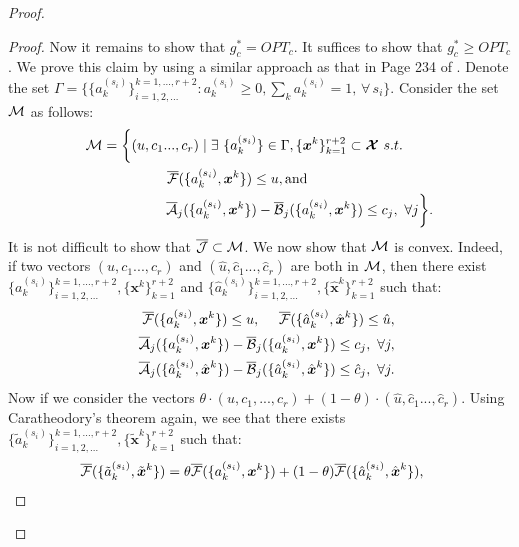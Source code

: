 \documentclass[journal]{IEEEtran}
\newcommand{\bv}[1]{{\boldsymbol{#1} }}
\newcommand{\script}[1]{{{\cal{#1} }}}
\begin{document}
\begin{proof}
\begin{proof}
Now it remains to show that $g_c^*=OPT_c$. It suffices to show that $g_c^*\geq OPT_c$. We prove this claim by using a similar approach as that in Page 234 of  \cite{boydconvexopt}. Denote the set $\Gamma=\{\{a^{(s_i)}_k\}_{i=1, 2, ...}^{k=1, ..., r+2}: a^{(s_i)}_k\geq0, \sum_ka^{(s_i)}_k=1,\,\forall\, s_i\}$. Consider the set $\script{M}$ as follows:
\begin{eqnarray*}
\script{M}=\bigg\{(u, c_1 ..., c_r)\left.|\right. \exists\,\, \{a^{(s_i)}_k\} \in\Gamma, \{\bv{x}^{k}\}_{k=1}^{r+2 }\subset\bv{\script{X}}\,\, s.t.\, \qquad\\
\overline{\script{F}}(\{a^{(s_i)}_k, \bv{x}^k\})\leq u, \text{and} \qquad\qquad\qquad\qquad\quad\\
\overline{\script{A}}_j(\{a^{(s_i)}_k, \bv{x}^k\})-\overline{\script{B}}_j(\{a^{(s_i)}_k, \bv{x}^k\})\leq c_j, \,\,\forall j\bigg\}. 
\end{eqnarray*}
It is not difficult to show that $\overline{\script{J}}\subset\script{M}$. We now show that $\script{M}$ is convex. Indeed, if two vectors $(u, c_1 ..., c_r)$ and $(\hat{u}, \hat{c}_1 ..., \hat{c}_r)$ are both in $\script{M}$, then there exist $\{a^{(s_i)}_k\}_{i=1, 2, ...}^{k=1, ..., r+2}, \{\bv{x}^{k}\}_{k=1}^{r+2 }$ and $\{\hat{a}^{(s_i)}_k\}_{i=1, 2, ...}^{k=1, ..., r+2}, \{\hat{\bv{x}}^{k}\}_{k=1}^{r+2 }$ such that:
\begin{eqnarray*}
&&\overline{\script{F}}(\{a^{(s_i)}_k, \bv{x}^k\})\leq u,\quad\,\,\overline{\script{F}}(\{\hat{a}^{(s_i)}_k, \hat{\bv{x}}^k\})\leq \hat{u},\\
&&\overline{\script{A}}_j(\{a^{(s_i)}_k, \bv{x}^k\})- \overline{\script{B}}_j(\{a^{(s_i)}_k, \bv{x}^k\})\leq c_j, \,\,\forall j,\\
&&\overline{\script{A}}_j(\{\hat{a}^{(s_i)}_k, \hat{\bv{x}}^k\})- \overline{\script{B}}_j(\{\hat{a}^{(s_i)}_k, \hat{\bv{x}}^k\})\leq \hat{c}_j, \,\,\forall j.
\end{eqnarray*}
Now if we consider the vectors $\theta\cdot(u, c_1, ..., c_r)+(1-\theta)\cdot (\hat{u}, \hat{c}_1 ..., \hat{c}_r)$. Using Caratheodory's theorem again, we see that there exists $\{\tilde{a}^{(s_i)}_k\}^{k=1, ...,r+2}_{i=1, 2, ...}, \{\tilde{\bv{x}}^{k}\}_{k=1}^{r+2 }$ such that:
\begin{eqnarray*}
\hspace{-.3in}&&\overline{\script{F}}(\{\tilde{a}^{(s_i)}_k, \tilde{\bv{x}}^{k}\})=\theta\overline{\script{F}}(\{a^{(s_i)}_k, \bv{x}^k\}) + (1-\theta)\overline{\script{F}}(\{\hat{a}^{(s_i)}_k, \hat{\bv{x}}^k\}),  \\

\end{eqnarray*}
\end{proof}
\end{proof}
\end{document}
